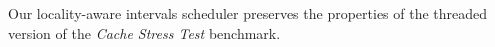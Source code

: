 Our locality-aware intervals scheduler preserves the properties of the
threaded version of the \emph{Cache Stress Test} benchmark.







